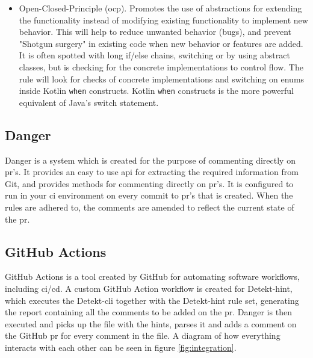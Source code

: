 \documentclass[pdftex,10pt,b5paper,twoside]{report}
\begin{document}
\begin{itemize}
    \item Open-Closed-Principle (\gls{ocp}). Promotes the use of abstractions for extending the functionality instead of modifying existing functionality to implement new behavior. This will help to reduce unwanted behavior (bugs), and prevent "Shotgun surgery" in existing code when new behavior or features are added. It is often spotted with long if/else chains, switching or by using abstract classes, but is checking for the concrete implementations to control flow\cite{ocp3}. The rule will look for checks of concrete implementations and switching on enums inside Kotlin \texttt{when} constructs. Kotlin \texttt{when} constructs is the more powerful equivalent of Java's switch statement.
\end{itemize}


\subsection{Danger}
Danger is a system which is created for the purpose of commenting directly on \gls{pr}'s. It provides an easy to use \gls{api} for extracting the required information from Git, and provides methods for commenting directly on \gls{pr}'s. It is configured to run in your \gls{ci} environment on every commit to \gls{pr}'s that is created. When the rules are adhered to, the comments are amended to reflect the current state of the \gls{pr}. 

\subsection{GitHub Actions}
GitHub Actions is a tool created by GitHub for automating software workflows, including \gls{ci}/\gls{cd}. A custom GitHub Action workflow is created for Detekt-hint, which executes the Detekt-\gls{cli} together with the Detekt-hint rule set, generating the report containing all the comments to be added on the \gls{pr}. Danger is then executed and picks up the file with the hints, parses it and adds a comment on the GitHub \gls{pr} for every comment in the file. A diagram of how everything interacts with each other can be seen in figure \ref{fig:integration}. 
\end{document}
